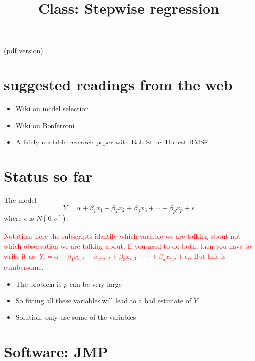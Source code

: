 \documentclass{article}
\begin{document}
\title{Class: Stepwise regression}
\maketitle

(\href{class_stepwise_regression.pdf}{pdf version})

\section{suggested readings from the web}
\begin{itemize}
\item \href{http://en.wikipedia.org/wiki/Model_selection}{Wiki on
model selection}
\item \href{http://en.wikipedia.org/wiki/Bonferroni_correction}{Wiki
on Bonferroni}
\item A fairly readable research paper with Bob Stine:
\href{http://www-stat.wharton.upenn.edu/\~stine/research/honests2.pdf}{Honest
RMSE}
\end{itemize}

\section{Status so far}

The model
\begin{displaymath}
Y = \alpha + \beta_1 x_1 + \beta_2 x_2 + \beta_3 x_3 + \cdots + \beta_p
x_p + \epsilon
\end{displaymath}
where $\epsilon$ is $N(0,\sigma^2)$.  

\textcolor{red}{{Notation: here the subscripts identify which variable we are
 talking about not which observation we are talking about.  If you
 need to do both, then you have to write it as: $Y_i = \alpha +
 \beta_1 x_{i,1} + \beta_2 x_{i,2} + \beta_3 x_{i,3} + \cdots + \beta_p
 x_{i,p} + \epsilon_i$.  But this is cumbersome.}}

\begin{itemize}
\item The problem is $p$ can be very large
\item So fitting all these variables will lead to a bad estimate of $Y$
\item Solution: only use some of the variables
\end{itemize}

\section{Software: JMP}
\end{document}
